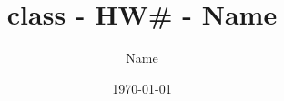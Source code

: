 \documentclass{article}
\begin{document}
\title{class - HW# - Name}
\author{Name}
\date{\today}
\maketitle
\end{document}
